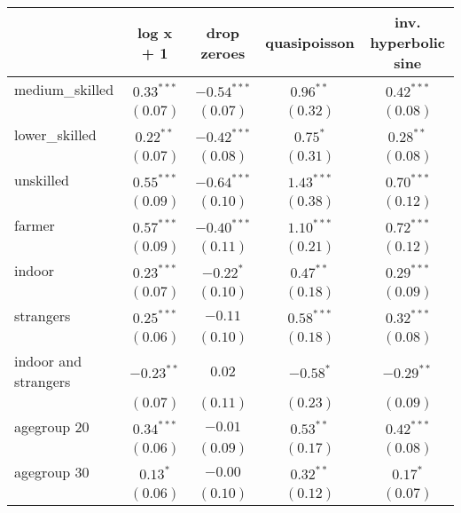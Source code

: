 
\begin{table}
\begin{center}
\begin{tabular}{l c c c c}
\hline
 & log x + 1 & drop zeroes & quasipoisson & inv. hyperbolic sine \\
\hline
medium\_skilled      & $0.33^{***}$  & $-0.54^{***}$ & $0.96^{**}$   & $0.42^{***}$  \\
                     & $(0.07)$      & $(0.07)$      & $(0.32)$      & $(0.08)$      \\
lower\_skilled       & $0.22^{**}$   & $-0.42^{***}$ & $0.75^{*}$    & $0.28^{**}$   \\
                     & $(0.07)$      & $(0.08)$      & $(0.31)$      & $(0.08)$      \\
unskilled            & $0.55^{***}$  & $-0.64^{***}$ & $1.43^{***}$  & $0.70^{***}$  \\
                     & $(0.09)$      & $(0.10)$      & $(0.38)$      & $(0.12)$      \\
farmer               & $0.57^{***}$  & $-0.40^{***}$ & $1.10^{***}$  & $0.72^{***}$  \\
                     & $(0.09)$      & $(0.11)$      & $(0.21)$      & $(0.12)$      \\
indoor               & $0.23^{***}$  & $-0.22^{*}$   & $0.47^{**}$   & $0.29^{***}$  \\
                     & $(0.07)$      & $(0.10)$      & $(0.18)$      & $(0.09)$      \\
strangers            & $0.25^{***}$  & $-0.11$       & $0.58^{***}$  & $0.32^{***}$  \\
                     & $(0.06)$      & $(0.10)$      & $(0.18)$      & $(0.08)$      \\
indoor and strangers & $-0.23^{**}$  & $0.02$        & $-0.58^{*}$   & $-0.29^{**}$  \\
                     & $(0.07)$      & $(0.11)$      & $(0.23)$      & $(0.09)$      \\
agegroup 20          & $0.34^{***}$  & $-0.01$       & $0.53^{**}$   & $0.42^{***}$  \\
                     & $(0.06)$      & $(0.09)$      & $(0.17)$      & $(0.08)$      \\
agegroup 30          & $0.13^{*}$    & $-0.00$       & $0.32^{**}$   & $0.17^{*}$    \\
                     & $(0.06)$      & $(0.10)$      & $(0.12)$      & $(0.07)$      \\

\end{tabular}
\end{center}
\end{table}
